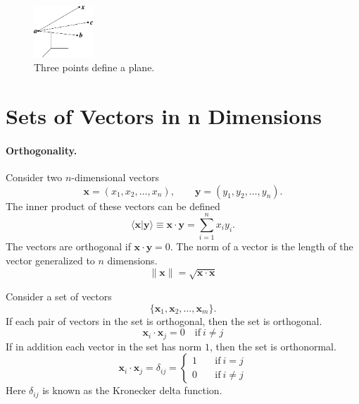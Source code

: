 \begin{figure}[htb!]
\begin{center}
  \includegraphics[width=0.2\textwidth]{algebra/vectors/stpplane}
\end{center}
\caption{Three points define a plane.}
\label{stpplane}
\end{figure}







\section{Sets of Vectors in n Dimensions}

\paragraph{Orthogonality.}
Consider two $n$-dimensional vectors
\[
\mathbf{x} = (x_1, x_2, \ldots, x_n), \qquad
        \mathbf{y} = (y_1, y_2, \ldots, y_n).
\]
The inner product of these vectors can be defined
\[
\langle \mathbf{x} | \mathbf{y} \rangle \equiv
\mathbf{x} \cdot \mathbf{y} = \sum_{i=1}^n x_i y_i.
\]
The vectors are orthogonal if $\mathbf{x} \cdot \mathbf{y} = 0$.  The norm of
a vector is the length of the vector generalized to $n$ dimensions.
\[
\| \mathbf{x} \| = \sqrt{\mathbf{x} \cdot \mathbf{x}}
\]

Consider a set of vectors
\[ \{\mathbf{x}_1, \mathbf{x}_2, \ldots, \mathbf{x}_m\}.\]
If each pair of vectors in the set is orthogonal, then the set is orthogonal.
\[
\mathbf{x}_i \cdot \mathbf{x}_j = 0 \quad \mathrm{if}\ i \neq j
\]
If in addition each vector in the set has norm $1$, then the set is
orthonormal.
\[
\mathbf{x}_i \cdot \mathbf{x}_j = \delta_{i j} =
        \begin{cases}
        1 \quad &\mathrm{if}\ i = j \\
        0 \quad &\mathrm{if}\ i \neq j
        \end{cases}
\]
Here $\delta_{i j}$ is known as the Kronecker delta function.


